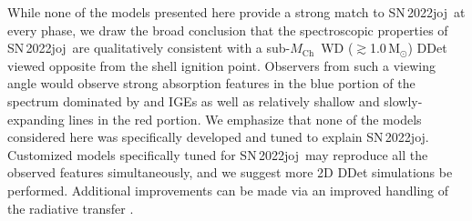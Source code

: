 \documentclass[twocolumn]{aastex631}
\newcommand{\sn}{SN\,2022joj}
\newcommand{\Mch}{$M_\mathrm{Ch}$}
\newcommand{\chang}[1]{\textcolor{blue}{[Chang: #1]}}
\begin{document}
\begin{CJK*}{UTF8}{gbsn}

While none of the models presented here provide a strong match to \sn\ at every phase, we draw the broad conclusion that the spectroscopic properties of \sn\ are qualitatively consistent with a sub-\Mch\ WD ($\gtrsim$1.0\,$\mathrm{M_\odot}$) DDet viewed opposite from the shell ignition point. Observers from such a viewing angle would observe strong absorption features in the blue portion of the spectrum dominated by  and IGEs as well as relatively shallow and slowly-expanding  lines in the red portion. We emphasize that none of the models considered here was specifically developed and tuned to explain \sn. Customized models specifically tuned for \sn\ may reproduce all the observed features simultaneously, and we suggest more 2D DDet simulations be performed. Additional improvements can be made via an improved handling of the radiative transfer \citep[e.g., non-LTE effects; see][]{Shen_NLTE_2021}.


\end{CJK*}
\end{document}
